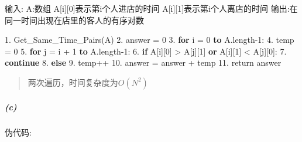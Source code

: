 \documentclass[
]{ctexart}
\newenvironment{Shaded}{}{}
\newcommand{\DecValTok}[1]{\textcolor[rgb]{0.25,0.63,0.44}{#1}}
\newcommand{\KeywordTok}[1]{\textcolor[rgb]{0.00,0.44,0.13}{\textbf{#1}}}
\newcommand{\NormalTok}[1]{#1}
\begin{document}
\begin{Shaded}
\begin{Highlighting}[]
\NormalTok{输入:}
\NormalTok{A:数组}
\NormalTok{  A[i][}\DecValTok{0}\NormalTok{]表示第i个人进店的时间}
\NormalTok{  A[i][}\DecValTok{1}\NormalTok{]表示第i个人离店的时间}
\NormalTok{输出:在同一时间出现在店里的客人的有序对数}

\DecValTok{1.}\NormalTok{ Get\_Same\_Time\_Pairs(A)}
\DecValTok{2.}\NormalTok{   answer = }\DecValTok{0}
\DecValTok{3.}   \KeywordTok{for}\NormalTok{ i = }\DecValTok{0} \KeywordTok{to}\NormalTok{ A.length}\DecValTok{{-}1}\NormalTok{:}
\DecValTok{4.}\NormalTok{  	 temp = }\DecValTok{0}
\DecValTok{5.}     \KeywordTok{for}\NormalTok{ j = i + }\DecValTok{1} \KeywordTok{to}\NormalTok{ A.length}\DecValTok{{-}1}\NormalTok{:}
\DecValTok{6.}    	 \KeywordTok{if}\NormalTok{ A[i][}\DecValTok{0}\NormalTok{] \textgreater{} A[j][}\DecValTok{1}\NormalTok{] }\KeywordTok{or}\NormalTok{ A[i][}\DecValTok{1}\NormalTok{] \textless{} A[j][}\DecValTok{0}\NormalTok{]:}
\DecValTok{7.}         \KeywordTok{continue}
\DecValTok{8.}       \KeywordTok{else}
\DecValTok{9.}\NormalTok{         temp++}
\DecValTok{10.}\NormalTok{    answer = answer + temp}
\DecValTok{11.}\NormalTok{  return answer}
\end{Highlighting}
\end{Shaded}

\begin{quote}
两次遍历，时间复杂度为\(O(N^2)\)
\end{quote}

\hypertarget{header-n12}{%
\subparagraph{(c)}\label{header-n12}}

伪代码:
\end{document}
